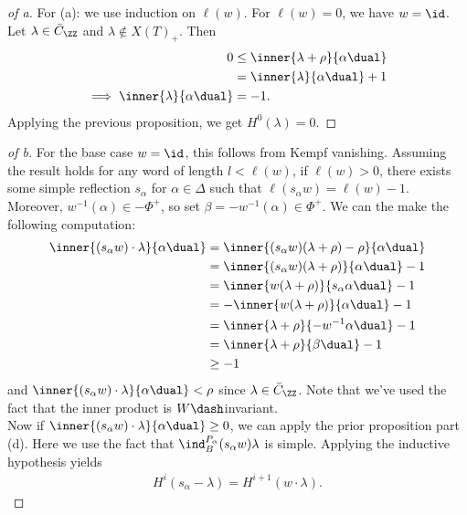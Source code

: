 \begin{proof}[of a]

For (a): we use induction on \(\ell(w)\). For \(\ell(w) = 0\), we have
\(w = \id\). Let \(\lambda \in \bar{C}_\ZZ\) and
\(\lambda\not\in X(T)_+\). Then
\begin{align*}  
0 
&\leq \inner{\lambda + \rho}{\alpha\dual} \\
&= \inner{\lambda}{\alpha\dual} + 1 \\
\implies \inner{\lambda}{\alpha\dual} &= -1
.\end{align*} Applying the previous proposition, we get
\(H^0(\lambda) = 0\).

\end{proof}

\begin{proof}[of b]

For the base case \(w=\id\), this follows from Kempf vanishing. Assuming
the result holds for any word of length \(l<\ell(w)\), if
\(\ell(w) > 0\), there exists some simple reflection \(s_\alpha\) for
\(\alpha\in\Delta\) such that \(\ell(s_\alpha w) = \ell(w) - 1\).
Moreover, \(w^{-1}(\alpha) \in -\Phi^+\), so set
\(\beta = -w^{-1}(\alpha) \in \Phi^+\). We can the make the following
computation:
\begin{align*}  
\inner{(s_\alpha w) \cdot \lambda}{\alpha\dual}
&= \inner{(s_\alpha w)(\lambda+\rho) - \rho}{\alpha\dual}  \\
&= \inner{(s_\alpha w)(\lambda+\rho)}{\alpha\dual} - 1 \\
&= \inner{w(\lambda+\rho)}{s_\alpha \alpha\dual} - 1 \\
&= - \inner{w(\lambda+\rho)}{\alpha\dual} - 1  \\
&= \inner{\lambda + \rho}{-w^{-1}\alpha\dual} - 1 \\
&= \inner{\lambda + \rho}{\beta\dual} - 1 \\
&\geq -1
\end{align*} and
\(\inner{(s_\alpha w)\cdot \lambda}{ \alpha\dual} < \rho\) since
\(\lambda\in \bar{C}_\ZZ\). Note that we've used the fact that the inner
product is \(W\dash\)invariant.\\

Now if \(\inner{(s_\alpha w)\cdot \lambda}{ \alpha\dual} \geq 0\), we
can apply the prior proposition part (d). Here we use the fact that
\(\ind_B^{P_\alpha}(s_\alpha w)\lambda\) is simple. Applying the
inductive hypothesis yields
\begin{align*}  
H^i(s_\alpha - \lambda) = H^{i+1}(w\cdot \lambda)
.\end{align*}


\end{proof}
